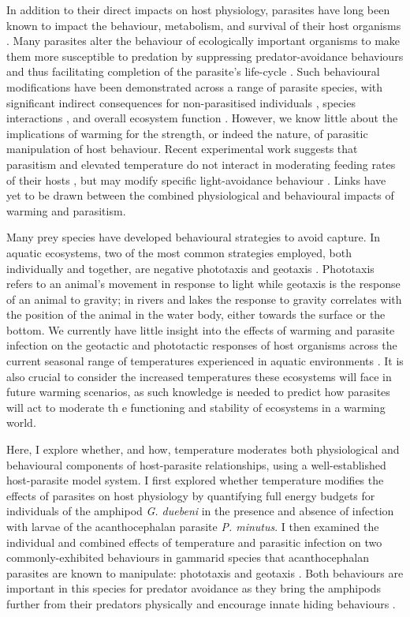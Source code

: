 In addition to their direct impacts on host physiology, parasites have long been known to impact the behaviour, metabolism, and survival of their host organisms \citep{burnett1949, kaldonski2009, perrot2012, poulin2013, perrot2014}. Many parasites alter the behaviour of ecologically important organisms to make them more susceptible to predation by suppressing predator-avoidance behaviours and thus facilitating completion of the parasite’s life-cycle \citep{dick2010, hatcher2014, toscano2014}. Such behavioural modifications have been demonstrated across a range of parasite species, with significant indirect consequences for non-parasitised individuals \citep{kadoya2015, demandt2018}, species interactions \citep{reisinger2015}, and overall ecosystem function \citep{sato2012}. However, we know little about the implications of warming for the strength, or indeed the nature, of parasitic manipulation of host behaviour. Recent experimental work suggests that parasitism and elevated temperature do not interact in moderating feeding rates of their hosts \citep{labaude2016}, but may modify specific light-avoidance behaviour \citep{labaude2017}. Links have yet to be drawn between the combined physiological and behavioural impacts of warming and parasitism. 

Many prey species have developed behavioural strategies to avoid capture. In aquatic ecosystems, two of the most common strategies employed, both individually and together, are negative phototaxis and geotaxis \citep{marriott1989, bauer2005}.  Phototaxis refers to an animal’s movement in response to light while geotaxis is the response of an animal to gravity; in rivers and lakes the response to gravity correlates with the position of the animal in the water body, either towards the surface or the bottom. We currently have little insight into the effects of warming and parasite infection on the geotactic and phototactic responses of host organisms across the current seasonal range of temperatures experienced in aquatic environments \citep{kaldonski2007, jacquin2014}. It is also crucial to consider the increased temperatures these ecosystems will face in future warming scenarios, as such knowledge is needed to predict how parasites will act to moderate th e functioning and stability of ecosystems in a warming world.

Here, I explore whether, and how, temperature moderates both physiological and behavioural components of host-parasite relationships, using a well-established host-parasite model system. I first explored whether temperature modifies the effects of parasites on host physiology by quantifying full energy budgets for individuals of the amphipod \emph{G. duebeni} in the presence and absence of infection with larvae of the acanthocephalan parasite \emph{P. minutus}. I then examined the individual and combined effects of temperature and parasitic infection on two commonly-exhibited behaviours in gammarid species that acanthocephalan parasites are known to manipulate: phototaxis and geotaxis \citep{bauer2005, perrot2012}. Both behaviours are important in this species for predator avoidance as they bring the amphipods further from their predators physically and encourage innate hiding behaviours \citep{bethel1973, cezilly2000, bauer2005, jacquin2014, perrot2016}. 

